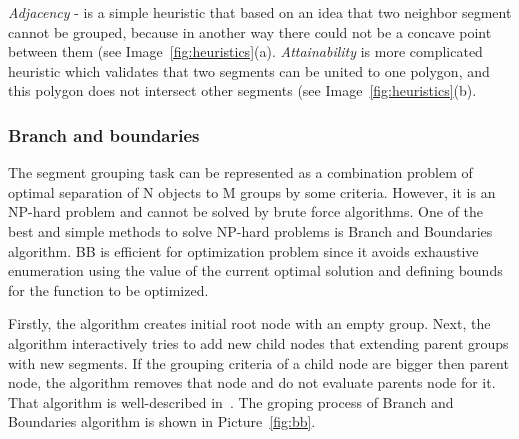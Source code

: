 \documentclass{lutmscthesis}[2010/09/22]
\begin{document}
\textit{Adjacency} - is a simple heuristic that based on an idea that two neighbor segment cannot be grouped, because in another way there could not be a concave point between them  (see Image~\ref{fig:heuristics}(a). 
\textit{Attainability} is more complicated heuristic which validates that two segments can be united to one polygon, and this polygon does not intersect other segments (see Image~\ref{fig:heuristics}(b).


\begin{figure}[htp]
\end{figure}

\subsubsection{Branch and boundaries}
The segment grouping task can be represented as a combination problem of optimal separation of N objects to M groups by some criteria. However, it is an NP-hard problem and cannot be solved by brute force algorithms. One of the best and simple methods to solve NP-hard problems is Branch and Boundaries algorithm.  BB is efficient for optimization problem since it avoids exhaustive enumeration using the value of the current optimal solution
and defining bounds for the function to be optimized. 

Firstly, the algorithm creates initial root node with an empty group. Next, the algorithm interactively tries to add new child nodes that extending parent groups with new segments. If the grouping criteria of a child node are bigger then parent node, the algorithm removes that node and do not evaluate parents node for it. That algorithm is well-described in~\cite{zafari-bb}.  The groping process of Branch and Boundaries algorithm is shown in Picture~\ref{fig:bb}.
\end{document}
